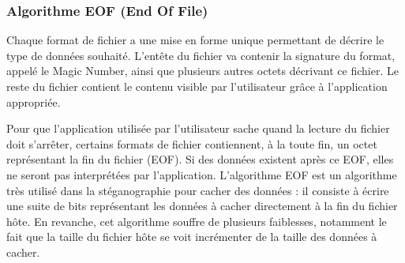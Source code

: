\documentclass[11pt]{article}
\begin{document}

\subsubsection{Algorithme EOF (End Of File)}

Chaque format de fichier a une mise en forme unique permettant de décrire le
type de données souhaité. L'entête du fichier va contenir la signature du
format, appelé le Magic Number, ainsi que plusieurs autres octets décrivant ce
fichier. Le reste du fichier contient le contenu visible par l'utilisateur grâce
à l'application appropriée. 

Pour que l'application utilisée par l'utilisateur sache quand la lecture du
fichier doit s'arrêter, certains formats de fichier contiennent, à la toute fin,
un octet représentant la fin du fichier (EOF). Si des données existent après ce
EOF, elles ne seront pas interprétées par l'application. L'algorithme EOF est un
algorithme très utilisé dans la stéganographie pour cacher des données : il
consiste à écrire une suite de bits représentant les données à cacher
directement à la fin du fichier hôte.
En revanche, cet algorithme souffre de plusieurs faiblesses, notamment 
le fait que la taille du fichier hôte se voit incrémenter de la taille 
des données à cacher.
\end{document}
